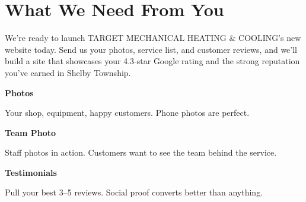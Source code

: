 \documentclass[11pt,letterpaper]{article}
\begin{document}
\vspace{0.2em}

\section*{What We Need From You}

We’re ready to launch TARGET MECHANICAL HEATING \& COOLING’s new website today. Send us your photos, service list, and customer reviews, and we’ll build a site that showcases your 4.3‑star Google rating and the strong reputation you’ve earned in Shelby Township.

\vspace{0.12em}

\noindent\begin{minipage}[t]{0.48\textwidth}
\begin{tcolorbox}[colframe=accent-teal, boxrule=1pt, left=0.7em, right=0.7em, top=0.5em, bottom=0.5em, arc=4pt, boxsep=0pt]
{\bfseries\small\color{accent-teal}Photos}

\vspace{0.15em}

{\small Your shop, equipment, happy customers. Phone photos are perfect.}
\end{tcolorbox}

\vspace{0.1em}

\begin{tcolorbox}[colframe=accent-teal, boxrule=1pt, left=0.7em, right=0.7em, top=0.5em, bottom=0.5em, arc=4pt, boxsep=0pt]
{\bfseries\small\color{accent-teal}Team Photo}

\vspace{0.15em}

{\small Staff photos in action. Customers want to see the team behind the service.}
\end{tcolorbox}

\vspace{0.1em}

\begin{tcolorbox}[colframe=accent-teal, boxrule=1pt, left=0.7em, right=0.7em, top=0.5em, bottom=0.5em, arc=4pt, boxsep=0pt]
{\bfseries\small\color{accent-teal}Testimonials}

\vspace{0.15em}

{\small Pull your best 3--5 reviews. Social proof converts better than anything.}
\end{tcolorbox}
\end{minipage}
\hfill
\end{document}
